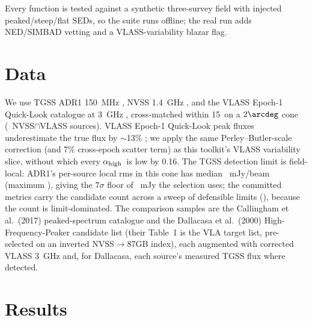 \documentclass[twocolumn]{aastex631}
\newcommand{\ahi}{\ensuremath{\alpha_{\rm high}}}
\begin{document}
Every function is tested against a synthetic three-survey field with injected peaked/steep/flat SEDs,
so the suite runs offline; the real run adds NED/SIMBAD vetting and a VLASS-variability blazar flag.

\section{Data}
We use TGSS ADR1 150~MHz \citep{intema2017}, NVSS 1.4~GHz \citep{condon1998}, and the VLASS Epoch-1
Quick-Look catalogue at 3~GHz \citep{gordon2021}, cross-matched within 15\arcsec\ on a $2\arcdeg$ cone
(\pkRealNnvssvlass\ NVSS$\cap$VLASS sources). VLASS Epoch-1 Quick-Look peak fluxes
underestimate the true flux by $\sim$13\% \citep{gordon2021}; we apply the same
Perley--Butler-scale correction (and 7\% cross-epoch scatter term) as this toolkit's VLASS
variability slice, without which every \ahi\ is low by 0.16. The TGSS detection limit is
field-local: ADR1's per-source local rms in this cone has median \pkRealNoiseMed~mJy/beam
(maximum \pkRealNoiseMax), giving the $7\sigma$ floor of \pkRealLimitUsed~mJy the selection
uses; the committed metrics carry the candidate count across a sweep of defensible limits
(\pkRealLimitSweep), because the count is limit-dominated. The comparison samples are the
Callingham et al.\ (2017) peaked-spectrum catalogue \citep{callingham2017} and the Dallacasa
et al.\ (2000) High-Frequency-Peaker candidate list \citep{dallacasa2000} (their
Table~1 is the VLA target list, pre-selected on an inverted NVSS$\to$87GB index), each
augmented with corrected VLASS 3~GHz and, for Dallacasa, each source's measured TGSS flux where
detected.

\section{Results}
\end{document}
